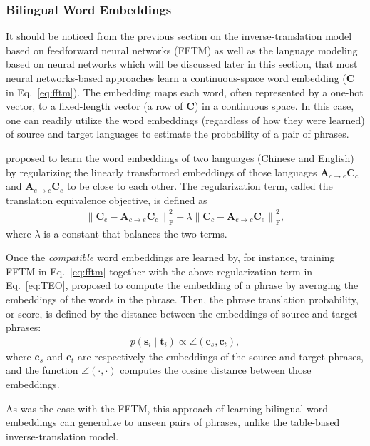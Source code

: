 \documentclass[11pt, oneside]{essay}
\newcommand{\vect}[1]{\mathbf{#1}}
\newcommand{\matr}[1]{\mathbf{#1}}
\newcommand{\vc}[0]{\vect{c}}
\newcommand{\vs}[0]{\vect{s}}
\newcommand{\vt}[0]{\vect{t}}
\newcommand{\mA}{\matr{A}}
\newcommand{\mC}{\matr{C}}
\begin{document}
\subsubsection{Bilingual Word Embeddings}
\label{sec:biembed}

It should be noticed from the previous section on the
inverse-translation model based on feedforward neural networks
(FFTM) as well as the language modeling based on neural networks
which will be discussed later in this section, that most neural
networks-based approaches learn a continuous-space word embedding
($\mC$ in Eq.~\eqref{eq:fftm}). The embedding maps each word,
often represented by a one-hot vector, to a fixed-length
vector (a row of $\mC$) in a continuous space.  In this case,
one can readily utilize the word embeddings (regardless of how
they were learned) of source and target languages to
estimate the probability of a pair of phrases. 

\citet{Zou2013} proposed to learn the word embeddings of two
languages (Chinese and English) by regularizing the linearly
transformed embeddings of those languages $\mA_{c\to e} \mC_c$
and $\mA_{e\to c} \mC_e$ to be close to each other. The
regularization term, called the translation equivalence
objective, is defined as
\begin{align}
\label{eq:TEO}
\left\| \mC_e - \mA_{c \to e} \mC_c \right\|^2_{\text{F}} + 
\lambda \left\| \mC_c - \mA_{e \to c} \mC_e \right\|^2_{\text{F}},
\end{align}
where $\lambda$ is a constant that balances the two terms.

Once the \textit{compatible} word embeddings are learned by, for
instance, training FFTM in Eq.~\eqref{eq:fftm} together with the
above regularization term in Eq.~\eqref{eq:TEO}, \citet{Zou2013}
proposed to compute the embedding of a phrase by averaging the
embeddings of the words in the phrase. Then, the phrase
translation probability, or score, is defined by the distance
between the embeddings of source and target phrases:
\begin{align*}
p(\vs_i \mid \vt_i) \propto \angle\left( \vc_s, \vc_t
        \right),
\end{align*}
where $\vc_s$ and $\vc_t$ are respectively the embeddings of the
source and target phrases, and the function $\angle(\cdot,\cdot)$
computes the cosine distance between those embeddings.

As was the case with the FFTM, this approach of learning
bilingual word embeddings can generalize to unseen pairs of
phrases, unlike the table-based inverse-translation model.
\end{document}
